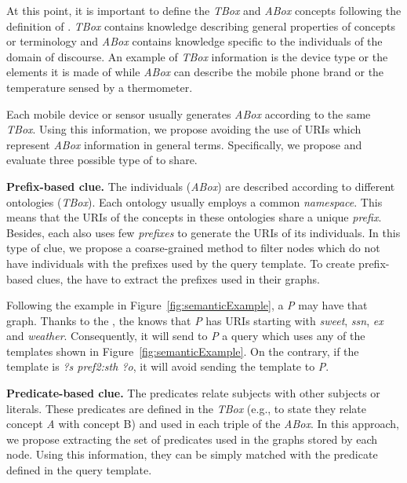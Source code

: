 At this point, it is important to define the \emph{TBox} and \emph{ABox} concepts following the definition of \citet{nardi2003introduction}.
\emph{TBox} contains knowledge describing general properties of concepts or terminology and
\emph{ABox} contains knowledge specific to the individuals of the domain of discourse.
An example of \emph{TBox} information is the device type or the elements it is made of
while \emph{ABox} can describe the mobile phone brand or the temperature sensed by a thermometer.

Each mobile device or sensor usually generates \emph{ABox} according to the same \emph{TBox}.
Using this information, we propose avoiding the use of URIs which represent \emph{ABox} information in general terms.
Specifically, we propose and evaluate three possible type of \clues{} to share.

\medskip

\noindent\textbf{Prefix-based clue.}
The individuals (\emph{ABox}) are described according to different ontologies (\emph{TBox}).
Each ontology usually employs a common \emph{namespace}.
This means that the URIs of the concepts in these ontologies share a unique \emph{prefix}.
Besides, each \provider{} also uses few \emph{prefixes} to generate the URIs of its individuals.
In this type of clue, we propose a coarse-grained method to filter nodes which do not have individuals with the prefixes used by the query template.
To create prefix-based clues, the \providers{} have to extract the prefixes used in their graphs. %

Following the example in Figure~\ref{fig:semanticExample}, a \provider{} \emph{P} may have that graph.
Thanks to the \clues{}, the \consumer{} knows that \emph{P} has URIs starting with \emph{sweet}, \emph{ssn}, \emph{ex} and \emph{weather}.
Consequently, it will send to \emph{P} a query which uses any of the templates shown in Figure~\ref{fig:semanticExample}.
On the contrary, if the template is \emph{?s pref2:sth ?o}, it will avoid sending the template to \emph{P}.


\medskip

\noindent\textbf{Predicate-based clue.}
The predicates relate subjects with other subjects or literals.
These predicates are defined in the \emph{TBox} (e.g., to state they relate concept \emph{A} with concept B) and used in each triple of the \emph{ABox}.
In this approach, we propose extracting the set of predicates used in the graphs stored by each node.
Using this information, they can be simply matched with the predicate defined in the query template.


